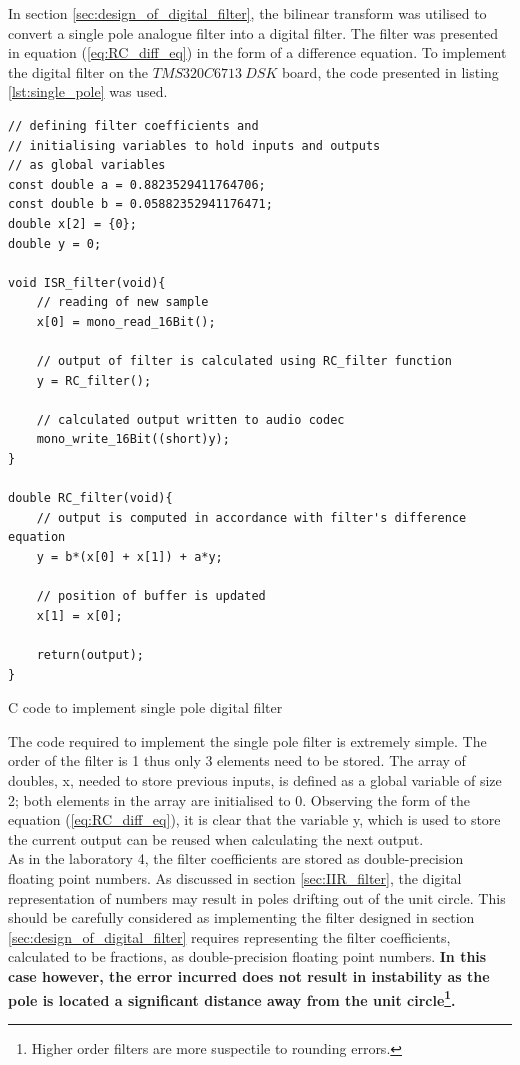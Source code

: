 \documentclass{article}
\begin{document}
In section \ref{sec:design_of_digital_filter}, the bilinear transform was utilised to convert a single pole analogue filter into a digital filter. The filter was presented in equation (\ref{eq:RC_diff_eq}) in the form of a difference equation. To implement the digital filter on the $TMS320C6713 \ DSK$ board, the code presented in listing \ref{lst:single_pole} was used.

\begin{listing}[H]
\begin{verbatim}
// defining filter coefficients and 
// initialising variables to hold inputs and outputs
// as global variables
const double a = 0.8823529411764706;
const double b = 0.05882352941176471;
double x[2] = {0}; 
double y = 0;

void ISR_filter(void){
    // reading of new sample
    x[0] = mono_read_16Bit();
    
    // output of filter is calculated using RC_filter function
    y = RC_filter();
    
    // calculated output written to audio codec
    mono_write_16Bit((short)y);
}

double RC_filter(void){			
    // output is computed in accordance with filter's difference equation
    y = b*(x[0] + x[1]) + a*y;
    
    // position of buffer is updated
    x[1] = x[0];
    
    return(output);		
}
\end{verbatim}
\caption{C code to implement single pole digital filter} 
\label{lst:single_pole}
\end{listing}

The code required to implement the single pole filter is extremely simple. The order of the filter is 1 thus only 3 elements need to be stored. The array of doubles, x, needed to store previous inputs, is defined as a global variable of size 2; both elements in the array are initialised to 0. Observing the form of the equation (\ref{eq:RC_diff_eq}), it is clear that the variable y, which is used to store the current output can be reused when calculating the next output.\\

As in the laboratory 4, the filter coefficients are stored as double-precision floating point numbers. As discussed in section \ref{sec:IIR_filter}, the digital representation of numbers may result in poles drifting out of the unit circle. This should be carefully considered as implementing the filter designed in section \ref{sec:design_of_digital_filter} requires representing the filter coefficients, calculated to be fractions, as double-precision floating point numbers. \textbf{In this case however, the error incurred does not result in instability as the pole is located a significant distance away from the unit circle\footnote{Higher order filters are more suspectile to rounding errors.}.}\\ 
\end{document}
